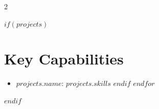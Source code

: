 \documentclass[10pt]{article}
\begin{document}
\begin{paracol}{2}
{$if(projects)$
\section*{Key Capabilities}
\begin{itemize}[leftmargin=0.75em]
$for(projects)$
$if(projects.skills)$
\item \textbf{$projects.name$}: {\footnotesize $projects.skills$}
$endif$
$endfor$
\end{itemize}
$endif$
}

\end{paracol}
\end{document}
